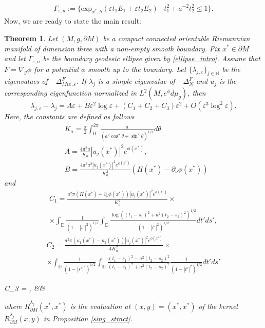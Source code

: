 \documentclass[12pt,a4paper]{amsart}
\numberwithin{equation}{section}
\theoremstyle{plain}
\newtheorem{theorem}{Theorem}[section]
\theoremstyle{definition}
\newcommand{\D}{\mathbb{D}}
\begin{document}
	\begin{align}\label{ellipse_intro}
		\Gamma_{\varepsilon,a}:=\{\mathrm{exp}_{x^*;h}(\varepsilon t_1 E_1+\varepsilon t_2 E_2)\mid t_1^2+a^{-2}t_2^2\leq 1\}.
	\end{align}
	Now, we are ready to state the main result:
	\begin{theorem}\label{main_for_ellipse}
		Let $(M,g,\partial M)$ be a compact connected orientable Riemannian manifold of dimension three with a non-empty smooth boundary. Fix $x^*\in \partial M$ and let $\Gamma_{\varepsilon,a}$ be the boundary geodesic ellipse given by \eqref{ellipse_intro}. Assume that $F = \nabla_g \phi$ for a potential $\phi$ smooth up to the boundary. Let $\{\lambda_{j,\varepsilon}\}_{j\in \mathbb N}$ be the eigenvalues of $-\Delta_{Mix,\varepsilon}^F$. If $\lambda_j$ is a simple eigenvalue of $-\Delta_N^F$ and $u_j$ is the corresponding eigenfunction normalized in $L^2(M,e^\phi d\mu_g)$, then
		\begin{equation*}
			\lambda_{j,\varepsilon} - \lambda_j = A\varepsilon + B\varepsilon^2 \log\varepsilon + (C_1 + C_2 + C_3)\varepsilon^2 + O(\varepsilon^3\log^2\varepsilon).
		\end{equation*}
		Here, the constants are defined as follows
		\begin{align*}
			& K_a = \frac{\pi}{2} \int_0^{2\pi} \frac{a}{(a^2\cos^2\theta + \sin^2\theta)^{1/2}}d\theta\\
			& A = \frac{4\pi^2a}{K_a} |u_j(x^*)|^2e^{\phi(x^*)},\\
			& B = \frac{4\pi^3 a^2 |u_j(x^*)|^2e^{\phi(x^*)}}{K_a^2} (H(x^*)-\partial_{\nu}\phi(x^*))
		\end{align*}
		and
		\begin{multline*}
			C_1 = \frac{a^2\pi(H(x^*)-\partial_{\nu}\phi(x^*))|u_j(x^*)|^2          e^{\phi(x^*)}}{K_a^2}\times\\
			\times\int_{\mathbb{D}} \frac{1}{ (1-|s'|^2)^{1/2}}  \int_\D  \frac{\log\left((t_1 - s_1)^2 + a^2 (t_2-s_2)^2 \right)^{1/2}}{(1-|t'|^2)^{1/2}} dt' ds',
		\end{multline*}
		\begin{multline*}
			C_2 = \frac{a^2\pi\left(\kappa_1(x^*) -                         \kappa_2(x^*)\right)|u_j(x^*)|^2 e^{\phi(x^*)} }{4K_a^2}\times\\
			\times \int_{\mathbb{D}} \frac{1}{ (1-|s'|^2)^{1/2}} \int_\D \frac{(t_1 - s_1)^2 - a^2 (t_2 - s_2)^2}{(t_1 - s_1)^2 + a^2 (t_2 - s_2)^2} \frac{1}{ (1-|t'|^2)^{1/2}} dt' ds'
		\end{multline*}
		
		\begin{flalign*}
			\;\:\;\: C_3 = , &&
		\end{flalign*}   
		where $R_{\partial M}^{\lambda_j}(x^*,x^*)$ is the evaluation at $(x,y)=(x^*,x^*)$ of the kernel $R_{\partial M}^{\lambda_j}(x,y)$ in Proposition \ref{sing_stract}.
	\end{theorem}
\end{document}
